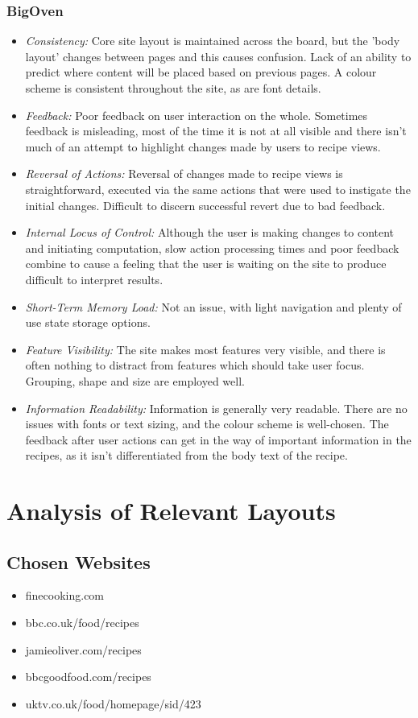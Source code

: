 \documentclass{article}
\begin{document}
\subsubsection*{BigOven}
\begin{itemize}
\item \emph{Consistency:} Core site layout is maintained across the board, but the 'body layout' changes between pages and this causes confusion. Lack of an ability to predict where content will be placed based on previous pages. A colour scheme is consistent throughout the site, as are font details.
\item \emph{Feedback:} Poor feedback on user interaction on the whole. Sometimes feedback is misleading, most of the time it is not at all visible and there isn't much of an attempt to highlight changes made by users to recipe views. 
\item \emph{Reversal of Actions:} Reversal of changes made to recipe views is straightforward, executed via the same actions that were used to instigate the initial changes. Difficult to discern successful revert due to bad feedback.
\item \emph{Internal Locus of Control:} Although the user is making changes to content and initiating computation, slow action processing times and poor feedback combine to cause a feeling that the user is waiting on the site to produce difficult to interpret results.
\item \emph{Short-Term Memory Load:} Not an issue, with light navigation and plenty of use state storage options.
\item \emph{Feature Visibility:} The site makes most features very visible, and there is often nothing to distract from features which should take user focus. Grouping, shape and size are employed well.
\item \emph{Information Readability:} Information is generally very readable. There are no issues with fonts or text sizing, and the colour scheme is well-chosen. The feedback after user actions can get in the way of important information in the recipes, as it isn't differentiated from the body text of the recipe.
\end{itemize}

\clearpage

\section{Analysis of Relevant Layouts}
\vspace{0.5cm}
\subsection{Chosen Websites}
\begin{itemize}
\item finecooking.com
\item bbc.co.uk/food/recipes
\item jamieoliver.com/recipes
\item bbcgoodfood.com/recipes
\item uktv.co.uk/food/homepage/sid/423
\end{itemize}
\end{document}
